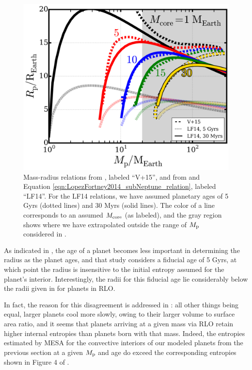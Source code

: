 \documentclass{svjour3}                     %
\begin{document}
\begin{figure}
\includegraphics[width=\textwidth]{compare_mass-radius_relations}
\caption{Mass-radius relations from \cite{2015ApJ...813..101V}, labeled ``V+15'', and from \cite{Lopez2014Understanding} and Equation \ref{eqn:LopezFortney2014_subNeptune_relation}, labeled ``LF14''. For the LF14 relations, we have assumed planetary ages of 5 Gyrs (dotted lines) and 30 Myrs (solid lines). The color of a line corresponds to an assumed $M_{\rm core}$ (as labeled), and the gray region shows where we have extrapolated outside the range of $M_{\rm p}$ considered in \cite{Lopez2014Understanding}.}
\label{fig:compare_mass-radius_relations}
\end{figure}

As indicated in \cite{2014ApJ...793L...3V}, the age of a planet becomes less important in determining the radius as the planet ages, and that study considers a fiducial age of 5 Gyrs, at which point the radius is insensitive to the initial entropy assumed for the planet's interior. Interestingly, the radii for this fiducial age lie considerably below the radii given in \cite{2015ApJ...813..101V} for planets in RLO. 

In fact, the reason for this disagreement is addressed in \cite{2014ApJ...793L...3V}: all other things being equal, larger planets cool more slowly, owing to their larger volume to surface area ratio, and it seems that planets arriving at a given mass via RLO retain higher internal entropies than planets born with that mass. Indeed, the entropies estimated by MESA for the convective interiors of our modeled planets from the previous section at a given $M_{\rm p}$ and age do exceed the corresponding entropies shown in Figure 4 of \cite{2014ApJ...793L...3V}. 
\end{document}
